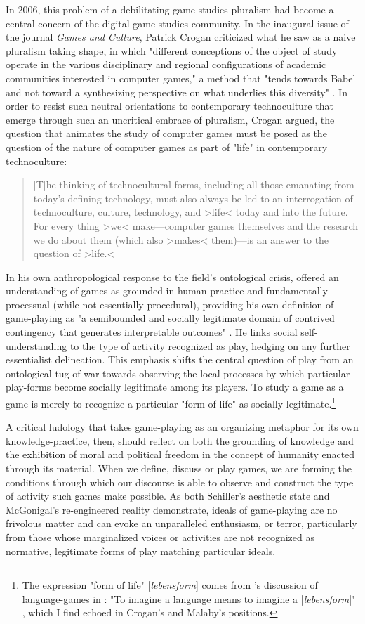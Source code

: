 In 2006, this problem of a debilitating game studies pluralism had become a central concern of the digital game studies community. In the inaugural issue of the journal \emph{Games and Culture}, Patrick Crogan criticized what he saw as a naive pluralism taking shape, in which "different conceptions of the object of study operate in the various disciplinary and regional configurations of academic communities interested in computer games," a method that "tends towards Babel and not toward a synthesizing perspective on what underlies this diversity" \autocite*[73]{Crogan2006}. In order to resist such neutral orientations to contemporary technoculture that emerge through such an uncritical embrace of pluralism, Crogan argued, the question that animates the study of computer games must be posed as the question of the nature of computer games as part of "life" in contemporary technoculture: \blockcquote[76]{Crogan2006}{
  |T|he thinking of technocultural forms, including all those emanating from today's defining technology, must also always be led to an interrogation of technoculture, culture, technology, and >life< today and into the future. For every thing >we< make---computer games themselves and the research we do about them (which also >makes< them)---is an answer to the question of >life.<
}
In his own anthropological response to the field's ontological crisis, \citeauthor{Malaby2007} offered an understanding of games as grounded in human practice and fundamentally processual (while not essentially procedural), providing his own definition of game-playing as "a semibounded and socially legitimate domain of contrived contingency that generates interpretable outcomes" \autocite[96]{Malaby2007}. He links social self-understanding to the type of activity recognized as play, hedging on any further essentialist delineation. This emphasis shifts the central question of play from an ontological tug-of-war towards observing the local processes by which particular play-forms become socially legitimate among its players. To study a game as a game is merely to recognize a particular "form of life" as socially legitimate.\footnote{
  The expression "form of life" [\emph{lebensform}] comes from \citeauthor{wittgenstein2001}'s discussion of language-games in : "To imagine a language means to imagine a |\emph{lebensform}|" \autocite[7\textsuperscript{e}]{wittgenstein2001},  which I find echoed in Crogan's and Malaby's positions.
}

A critical ludology that takes game-playing as an organizing metaphor for its own knowledge-practice, then, should reflect on both the grounding of knowledge and the exhibition of moral and political freedom in the concept of humanity enacted through its material. When we define, discuss or play games, we are forming the conditions through which our discourse is able to observe and construct the type of activity such games make possible. As both Schiller's aesthetic state and McGonigal's re-engineered reality demonstrate, ideals of game-playing are no frivolous matter and can evoke an unparalleled enthusiasm, or terror, particularly from those whose marginalized voices or activities are not recognized as normative, legitimate forms of play matching particular ideals.

